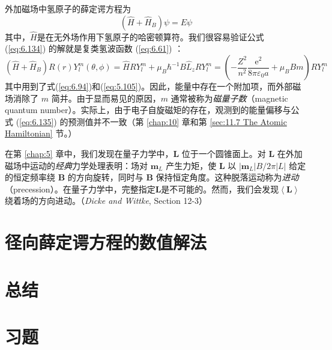     外加磁场中氢原子的薛定谔方程为
    \begin{equation}
        \left(\hat{H}+\hat{H}_B\right)\psi = E\psi
        \label{eq:6.134}
    \end{equation}
    其中，$\hat{H}$是在无外场作用下氢原子的哈密顿算符。我们很容易验证公式 (\ref{eq:6.134}) 的解就是复类氢波函数 (\ref{eq:6.61}) ：
    \begin{equation}
        \left(\hat{H}+\hat{H}_B\right)R\left(r\right)Y_l^m\left(\theta,\phi\right) = \hat{H}RY_l^m + \mu_B\hbar^{-1}B\hat{L}_zRY_l^m = \left(-\frac{Z^2}{n^2}\frac{\mathrm{e}^2}{8\pi\varepsilon_0a}+\mu_BBm\right)RY_l^m
        \label{eq:6.135}
    \end{equation}
    其中用到了式(\ref{eq:6.94})和(\ref{eq:5.105})。因此，能量中存在一个附加项，而外部磁场消除了 $m$ 简并。由于显而易见的原因，$m$ 通常被称为\textit{磁量子数}（magnetic quantum number）。实际上，由于电子自旋磁矩的存在，观测到的能量偏移与公式 (\ref{eq:6.135}) 的预测值并不一致（第 \ref{chap:10} 章和第 \ref{sec:11.7 The Atomic Hamiltonian} 节。）

    在第 \ref{chap:5} 章中，我们发现在量子力学中，$\mathbf{L}$ 位于一个圆锥面上。对 $\mathbf{L}$ 在外加磁场中运动的\textit{经典}力学处理表明：场对 $\mathbf{m}_L$ 产生力矩，使 $\mathbf{L}$ 以 $\left|\mathbf{m}_L\right|B/2\pi \left|L\right|$ 给定的恒定频率绕 $\mathbf{B}$ 的方向旋转，同时与 $\mathbf{B}$ 保持恒定角度。这种脱落运动称为\textit{进动}（precession）。在量子力学中，完整指定$\mathbf{L}$是不可能的。然而，我们会发现$\left\langle \mathbf{L} \right\rangle$绕着场的方向进动。（\textit{Dicke and Wittke}, Section 12-3）

\section{径向薛定谔方程的数值解法}
\label{sec:6.9 Numerical Solution of the Radial Schrödinger Equation}

\section*{总结}

\section*{习题}
